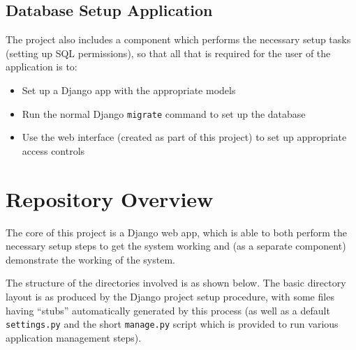 \documentclass[12pt]{report}
\begin{document}
\subsection{Database Setup Application}
The project also includes a component which performs the necessary setup tasks (setting up SQL permissions), so that all that is required for the user of the application is to:
\begin{itemize}
\item
  Set up a Django app with the appropriate models
\item
  Run the normal Django \texttt{migrate} command to set up the database
\item
  Use the web interface (created as part of this project) to set up appropriate access controls
\end{itemize}

\section{Repository Overview}
The core of this project is a Django web app, which is able to both perform the necessary setup steps to get the system working and (as a separate component) demonstrate the working of the system.

The structure of the directories involved is as shown below. The basic directory layout is as produced by the Django project setup procedure, with some files having ``stubs'' automatically generated by this process (as well as a default \texttt{settings.py} and the short \texttt{manage.py} script which is provided to run various application management steps).

\begin{multicols}{2}
  \columnbreak
\end{multicols}
\end{document}
